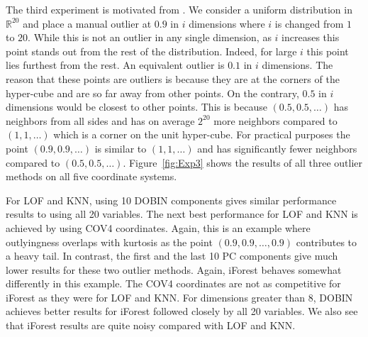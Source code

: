 \documentclass[letter,12pt]{article}
\begin{document}
The third experiment is motivated from \cite{zimek2012survey}. We consider a uniform distribution in $\mathbb{R}^{20}$ and place a manual outlier at $0.9$ in $i$ dimensions where $i$ is changed from $1$ to $20$. While this is not an outlier in any single dimension, as $i$ increases this point stands out from the rest of the distribution. Indeed, for large $i$ this point lies furthest from the rest. An equivalent outlier is $0.1$ in $i$ dimensions. The reason that these points are outliers is because they are at the corners of the hyper-cube and are so far away from other points. On the contrary, $0.5$ in $i$ dimensions would be closest to other points. This is because $(0.5, 0.5, \dots)$ has neighbors from all sides and has on average $2^{20}$ more neighbors compared to $(1, 1, \dots)$ which is a corner on the unit hyper-cube. For practical purposes the point $(0.9, 0.9, \dots)$ is similar to $(1, 1, \dots)$ and has significantly {\color{blue} fewer } neighbors compared to $(0.5, 0.5, \dots)$. Figure~\ref{fig:Exp3} shows the results of all three outlier methods on all {\color{blue} five } coordinate systems. %

{\color{blue} For LOF and KNN, using 10 DOBIN components gives similar performance results to using all 20 variables. The next best performance for LOF and KNN is achieved by using COV4 coordinates. Again, this is an example where outlyingness overlaps with kurtosis as the point $(0.9, 0.9, \ldots, 0.9)$ contributes to a heavy tail. In contrast, the first and the last 10 PC components give much lower results for these two outlier methods. Again, iForest behaves somewhat differently in this example. The COV4 coordinates are not as competitive for iForest as they were for LOF and KNN. For dimensions greater than 8, DOBIN achieves better results for iForest followed closely by all 20 variables.  We also see that iForest results are quite noisy compared with LOF and KNN. }
\end{document}
